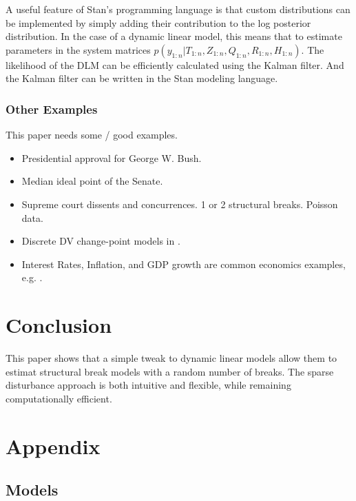 \documentclass{article}
\begin{document}
A useful feature of Stan's programming language is that custom distributions can be implemented by simply adding their contribution to the log posterior distribution.
In the case of a dynamic linear model, this means that to estimate parameters in the system matrices  $p(y_{1:n} | T_{1:n}, Z_{1:n}, Q_{1:n}, R_{1:n}, H_{1:n})$.
The likelihood of the DLM can be efficiently calculated using the Kalman filter. 
And the Kalman filter can be written in the Stan modeling language.

\subsubsection{Other Examples}

This paper needs some / good examples.

\begin{itemize}
\item Presidential approval for George W. Bush. \parencites{RatkovicEng2010}
\item Median ideal point of the Senate. \parencites{RatkovicEng2010}
\item Supreme court dissents and concurrences. 1 or 2 structural breaks. Poisson data. \parencite{CalderiaZorn1998}
\item Discrete DV change-point models in \parencite{spirling2007bayesian}.
\item Interest Rates, Inflation, and GDP growth are common economics examples, e.g. \textcite{GiordaniKohn2008}.
\end{itemize}

\section{Conclusion}
\label{sec:conclusion}

This paper shows that a simple tweak to dynamic linear models allow them to estimat structural break models with a random number of breaks.
The sparse disturbance approach is both intuitive and flexible, while remaining computationally efficient.

\clearpage{}
\section{Appendix}
\label{sec:appendix}

\subsection{Models}
\label{sec:models}
\end{document}
